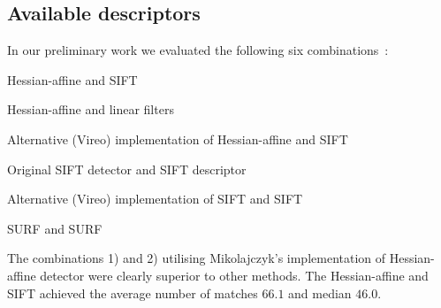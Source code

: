 \documentclass[journal]{IEEEtran}
\begin{document}





%
\subsection{Available descriptors}
%
In our preliminary work we evaluated the following six
combinations~\cite{LanKanKam:2012}:
\begin{compactenum}
\item Hessian-affine and SIFT
\item Hessian-affine and linear filters
\item Alternative (Vireo) implementation of Hessian-affine and SIFT
\item Original SIFT detector and SIFT descriptor
\item Alternative (Vireo) implementation of SIFT and SIFT
\item SURF and SURF
\end{compactenum}
The combinations 1) and 2) utilising Mikolajczyk's implementation
of Hessian-affine detector were clearly superior to other methods.
The Hessian-affine and SIFT achieved the average number of matches
$66.1$ and median $46.0$.
\end{document}
